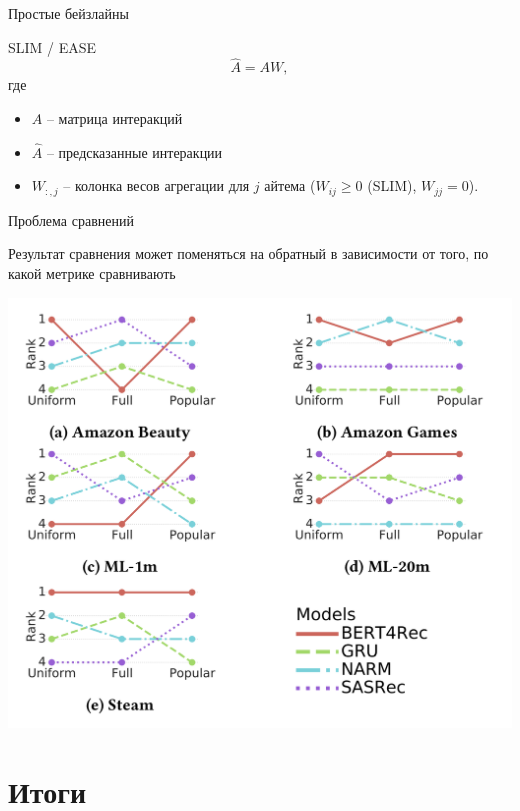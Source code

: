 \documentclass[11pt,aspectratio=169]{beamer}
\begin{document}
\begin{frame}{Простые бейзлайны}

SLIM \cite{SLIM} / EASE \cite{EASE}
\[
\hat A = A W,
\]
где 
\begin{itemize}
\item $A$ -- матрица интеракций
\item $\hat A$ -- предсказанные интеракции
\item $W_{:,j}$ -- колонка весов агрегации для  $j$ айтема ($W_{ij} \geq 0$ (SLIM), $W_{jj} = 0$).
\end{itemize}

\end{frame}

\begin{frame}{Проблема сравнений \cite{DALMANN}}

\begin{tcolorbox}[colback=warn!5,colframe=warn!80,title=]
Результат сравнения может поменяться на обратный в зависимости от того, по какой метрике сравнивають
\end{tcolorbox}

\begin{center}
\includegraphics[scale=0.25]{images/compare.png}
\end{center}

\end{frame}

\section{Итоги}
\end{document}
